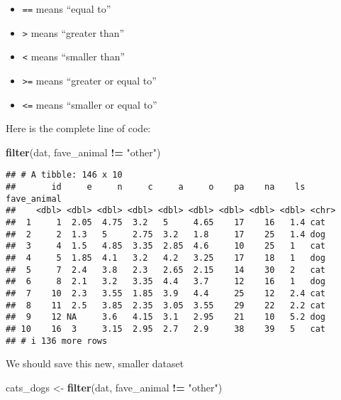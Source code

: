 \documentclass[
]{article}
\newenvironment{Shaded}{\begin{snugshade}}{\end{snugshade}}
\newcommand{\FunctionTok}[1]{\textcolor[rgb]{0.13,0.29,0.53}{\textbf{#1}}}
\newcommand{\NormalTok}[1]{#1}
\newcommand{\OtherTok}[1]{\textcolor[rgb]{0.56,0.35,0.01}{#1}}
\newcommand{\SpecialCharTok}[1]{\textcolor[rgb]{0.81,0.36,0.00}{\textbf{#1}}}
\newcommand{\StringTok}[1]{\textcolor[rgb]{0.31,0.60,0.02}{#1}}
\providecommand{\tightlist}{%
  \setlength{\itemsep}{0pt}\setlength{\parskip}{0pt}}
\begin{document}
\begin{itemize}
\tightlist
\item
  \texttt{==} means ``equal to''
\item
  \texttt{\textgreater{}} means ``greater than''
\item
  \texttt{\textless{}} means ``smaller than''
\item
  \texttt{\textgreater{}=} means ``greater or equal to''
\item
  \texttt{\textless{}=} means ``smaller or equal to''
\end{itemize}

Here is the complete line of code:

\begin{Shaded}
\begin{Highlighting}[]
\FunctionTok{filter}\NormalTok{(dat, fave\_animal }\SpecialCharTok{!=} \StringTok{"other"}\NormalTok{)}
\end{Highlighting}
\end{Shaded}

\begin{verbatim}
## # A tibble: 146 x 10
##       id     e     n     c     a     o    pa    na    ls fave_animal
##    <dbl> <dbl> <dbl> <dbl> <dbl> <dbl> <dbl> <dbl> <dbl> <chr>      
##  1     1  2.05  4.75  3.2   5     4.65    17    16   1.4 cat        
##  2     2  1.3   5     2.75  3.2   1.8     17    25   1.4 dog        
##  3     4  1.5   4.85  3.35  2.85  4.6     10    25   1   cat        
##  4     5  1.85  4.1   3.2   4.2   3.25    17    18   1   dog        
##  5     7  2.4   3.8   2.3   2.65  2.15    14    30   2   cat        
##  6     8  2.1   3.2   3.35  4.4   3.7     12    16   1   dog        
##  7    10  2.3   3.55  1.85  3.9   4.4     25    12   2.4 cat        
##  8    11  2.5   3.85  2.35  3.05  3.55    29    22   2.2 cat        
##  9    12 NA     3.6   4.15  3.1   2.95    21    10   5.2 dog        
## 10    16  3     3.15  2.95  2.7   2.9     38    39   5   cat        
## # i 136 more rows
\end{verbatim}

We should save this new, smaller dataset

\begin{Shaded}
\begin{Highlighting}[]
\NormalTok{cats\_dogs }\OtherTok{\textless{}{-}} \FunctionTok{filter}\NormalTok{(dat, fave\_animal }\SpecialCharTok{!=} \StringTok{"other"}\NormalTok{)}
\end{Highlighting}
\end{Shaded}
\end{document}
